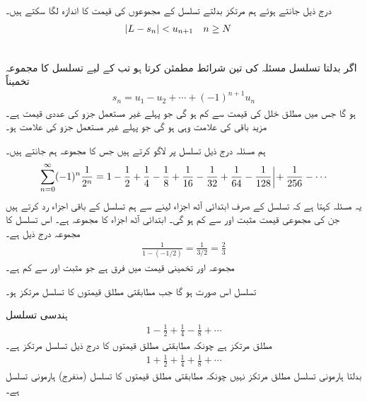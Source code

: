 درج ذیل   جانتے  ہوئے   ہم مرتکز بدلتے تسلسل کے مجموعوں  کی قیمت  کا اندازہ  لگا سکتے ہیں۔
\begin{align*}
\abs{L-s_n}&<u_{n+1}&&n\ge N
\end{align*}

\\
اگر بدلتا تسلسل  مسئلہ  کی  تین شرائط مطمئن کرتا ہو تب  کے لیے  تسلسل کا مجموعہ  تخمیناً
\begin{align*}
s_n=u_1-u_2+\cdots+(-1)^{n+1}u_n
\end{align*}
ہو گا جس میں مطلق خلل کی قیمت  سے کم ہو گی جو پہلے غیر مستعمل جزو کی عددی قیمت ہے۔ مزید باقی  کی علامت وہی ہو گی جو پہلے غیر مستعمل جزو کی علامت ہو۔ 

ہم مسئلہ  درج ذیل تسلسل پر لاگو کرتے ہیں جس کا مجموعہ ہم جانتے ہیں۔
\begin{align*}
\sum_{n=0}^{\infty}(-1)^n\frac{1}{2^n}=1-\frac{1}{2}+\frac{1}{4}-\frac{1}{8}+\frac{1}{16}-\frac{1}{32}+\frac{1}{64}-\frac{1}{128}\,\protect\rule[-2ex]{0.1ex}{5ex}+\frac{1}{256}-\cdots
\end{align*}
یہ مسئلہ کہتا ہے کہ تسلسل کے صرف  ابتدائی آٹھ اجزاء لینے سے ہم   تسلسل کے باقی اجزاء  رد کرتے ہیں  جن کی   مجموعی قیمت  مثبت اور  سے کم ہو گی۔ ابتدائی آٹھ اجزاء کا مجموعہ  ہے۔ اس تسلسل کا مجموعہ درج ذیل ہے۔
\begin{align*}
\frac{1}{1-(-1/2)}=\frac{1}{3/2}=\frac{2}{3}
\end{align*}
مجموعہ اور تخمینی قیمت میں فرق  ہے جو مثبت اور  سے کم ہے۔

تسلسل  اس صورت  ہو گا جب مطابقتی  مطلق قیمتوں کا  تسلسل  مرتکز ہو۔

ہندسی تسلسل
\begin{align*}
1-\frac{1}{2}+\frac{1}{4}-\frac{1}{8}+\cdots
\end{align*}
مطلق مرتکز ہے چونکہ  مطابقتی مطلق قیمتوں کا    درج ذیل     تسلسل مرتکز ہے۔
\begin{align*}
1+\frac{1}{2}+\frac{1}{4}+\frac{1}{8}+\cdots
\end{align*}
بدلتا ہارمونی تسلسل مطلق مرتکز نہیں  چونکہ   مطابقتی مطلق قیمتوں کا    تسلسل (منفرج) ہارمونی تسلسل ہے۔

